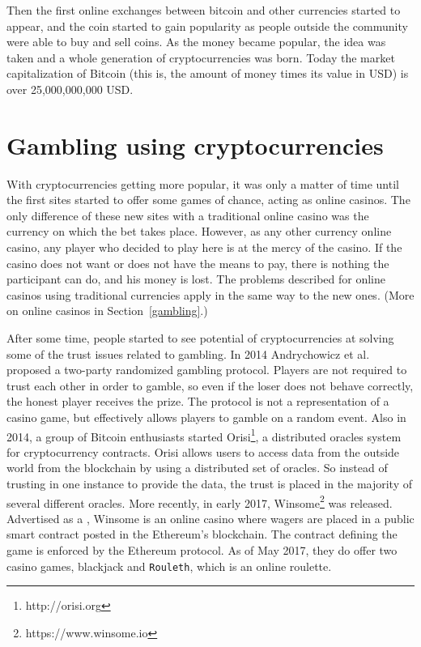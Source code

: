 Then the first online exchanges between bitcoin and other currencies started
  to appear, and the coin started to gain popularity as people outside the
  community were able to buy and sell coins.
As the money became popular, the idea was taken and a whole generation of
  cryptocurrencies was born.
Today the market capitalization of Bitcoin (this is, the amount of money times
  its value in USD) is over 25,000,000,000 USD.

\section{Gambling using cryptocurrencies}

With cryptocurrencies getting more popular, it was only a matter of time until
  the first sites started to offer some games of chance, acting as online
  casinos.
The only difference of these new sites with a traditional online casino was the
  currency on which the bet takes place.
However, as any other currency online casino, any player who decided to play
  here is at the mercy of the casino.
If the casino does not want or does not have the means to pay, there is nothing
  the participant can do, and his money is lost.
The problems described for online casinos using traditional currencies apply in
the same way to the new ones.
(More on online casinos in Section~\ref{gambling}.)

After some time, people started to see potential of cryptocurrencies at solving
  some of the trust issues related to gambling.
In 2014 Andrychowicz et al.  proposed a
  two-party randomized gambling protocol.
Players are not required to trust each other in order to gamble, so even if the
  loser does not behave correctly, the honest player receives the prize.
The protocol is not a representation of a casino game, but effectively allows
  players to gamble on a random event.
Also in 2014, a group of Bitcoin enthusiasts started
  Orisi\footnote{http://orisi.org}, a distributed oracles system for
  cryptocurrency contracts.
Orisi allows users to access data from the outside world from the blockchain
  by using a distributed set of oracles. So instead of trusting in one instance
  to provide the data, the trust is placed in the majority of several different
  oracles.
More recently, in early 2017, Winsome\footnote{https://www.winsome.io} was
  released. Advertised as a , Winsome
  is an online casino where wagers are placed in a public smart contract posted
  in the Ethereum's blockchain.
The contract defining the game is enforced by the Ethereum protocol.
As of May 2017, they do offer two casino games, blackjack and \texttt{Rouleth},
  which is an online roulette.

